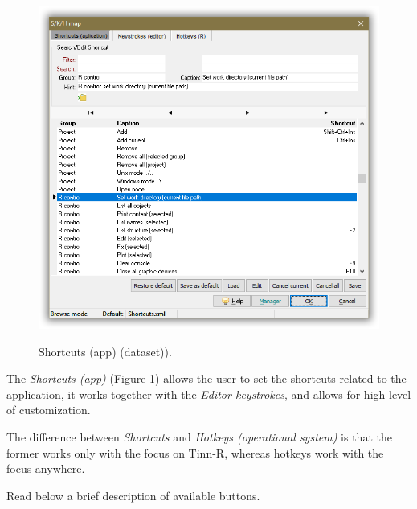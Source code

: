 \begin{figure}[H]
  \begin{center}
    \includegraphics[scale=0.8]{./res/dlg_skh_map_shortcuts.png}\\
  \end{center}
  \caption{Shortcuts (app) (dataset)).}
  \label{fig:dlg_shortcuts}
\end{figure}
The \textit{Shortcuts (app)}
(Figure \ref{fig:dlg_shortcuts})
allows the user to set the shortcuts related
to the application, it works together with the \textit{Editor keystrokes},
and allows for high level of customization.

The difference between \textit{Shortcuts} and \textit{Hotkeys (operational system)}
is that the former works only with the focus on Tinn-R, whereas hotkeys work
with the focus anywhere.

Read below a brief description of available buttons.

